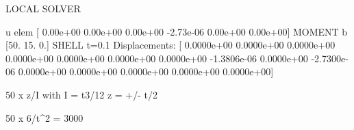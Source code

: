 LOCAL SOLVER 
       
u elem [ 0.00e+00  0.00e+00  0.00e+00 -2.73e-06  0.00e+00  0.00e+00]
MOMENT b [50. 15.  0.]
SHELL t=0.1
Displacements: [ 0.0000e+00  0.0000e+00  0.0000e+00  0.0000e+00  0.0000e+00  0.0000e+00
  0.0000e+00 -1.3806e-06  0.0000e+00 -2.7300e-06  0.0000e+00  0.0000e+00
  0.0000e+00  0.0000e+00  0.0000e+00]
  
50 x z/I
with I = t3/12
z = +/- t/2

50 x 6/t^2 = 3000 